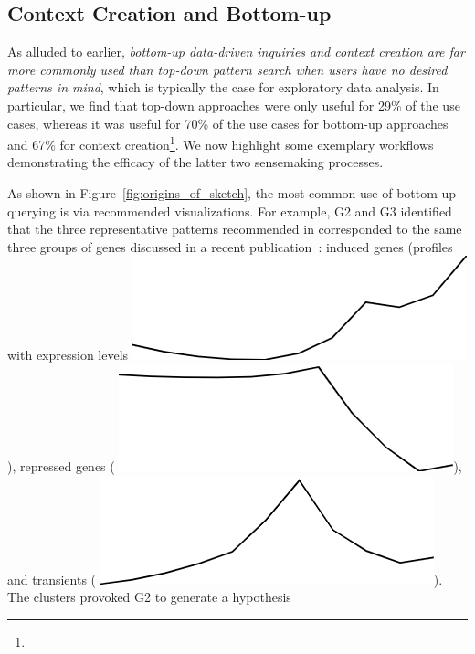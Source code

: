 \subsection{Context Creation and Bottom-up }%
\par As alluded to earlier,
\emph{bottom-up data-driven inquiries
and context creation are far more commonly
used than top-down pattern search
when users have no desired patterns in mind},
which is typically the case for exploratory data analysis.
In particular, we find that top-down approaches
were only useful for 29\% of the use cases,
whereas it was useful for 70\% of the use cases
for bottom-up approaches and 67\%
for context creation\footnote{}. We now highlight some exemplary workflows demonstrating the efficacy of the latter two sensemaking processes.
\par As shown in Figure~\ref{fig:origins_of_sketch},
the most common use of bottom-up querying
is via recommended visualizations. For example, G2 and G3 identified that
the three representative patterns
recommended in \zvpp corresponded
to the same three groups of genes discussed
in a recent publication~\cite{Gloss2017}:
induced genes (profiles with expression levels  \includegraphics[width=2\baselineskip,keepaspectratio]{figures/induced.png}),
repressed genes ( \includegraphics[width=2\baselineskip,keepaspectratio]{figures/repressed.png}),
and transients ( \includegraphics[width=2\baselineskip,keepaspectratio]{figures/transient.png}). The clusters provoked G2 to generate a hypothesis
